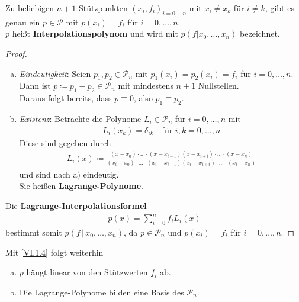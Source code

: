 
\begin{Satze}\label{6.1.1}
  Zu beliebigen $n+1$ Stützpunkten $(x_i, f_i)_{i=0, \dots n}$ 
  mit $x_i\neq x_k$ für $i\neq k$,
  gibt es genau ein $p\in \mathcal{P}$ mit $p(x_i) = f_i$ für $i=0,
  \dots ,n$.\\
  $p$ heißt \textbf{Interpolationspolynom}
  und wird mit $p(f|x_0, \dots, x_n) $ bezeichnet.
\end{Satze}

\begin{proof}~
  \begin{enumerate}[a)]
  \item \textit{Eindeutigkeit}:
    Seien $p_1, p_2\in \mathcal{P}_n$ mit $p_1(x_i)=p_2(x_i) = f_i$
    für $i=0, \dots, n$.
    Dann ist $p\coloneqq p_1-p_2 \in\mathcal{P}_n$
    mit mindestens $n+1$ Nullstellen. \\
    Daraus folgt bereits, dass $p\equiv 0$, also $p_1\equiv p_2$.

  \item \textit{Existenz}: 
    Betrachte die Polynome $L_i\in\mathcal{P}_n$ für $i=0, \dots, n$
    mit 
    \begin{gather}
      L_i(x_k) = \delta_{ik}\quad \text{für } i,k=0, \dots, n 
      \label{VI.1.2}
    \end{gather}
    Diese sind gegeben durch
    \begin{gather}
      L_i(x) \coloneqq \frac{(x-x_0)\cdot \dotsc
        \cdot (x-x_{i-1})(x-x_{i+i}) \cdot \dotsc
        \cdot (x-x_n)}
      {(x_i-x_0)\cdot \dots
        \cdot (x_i-x_{i-1})(x_i-x_{i+i}) \cdot \dotsc
        \cdot (x_i-x_n)}
      \label{VI.1.3}
    \end{gather}
    und sind nach a) eindeutig. \\
    Sie heißen \textbf{Lagrange-Polynome}.
  \end{enumerate}
  Die \textbf{Lagrange-Interpolationsformel}
  \begin{gather}
    p(x) = \sum_{i=0}^{n} f_iL_i(x)
    \label{VI.1.4}
  \end{gather}
  bestimmt somit $p(f\,|\,x_0, \dots, x_n)$,
  da $p\in\mathcal{P}_n$ und $p(x_i) = f_i$ für $i=0,\dots, n$.
\end{proof}

Mit \eqref{VI.1.4} folgt weiterhin
\begin{enumerate}[a)]
\item $p$ hängt linear von den Stützwerten $f_i$ ab.
\item Die Lagrange-Polynome bilden eine Basis des $\mathcal{P}_n$.
\end{enumerate}

